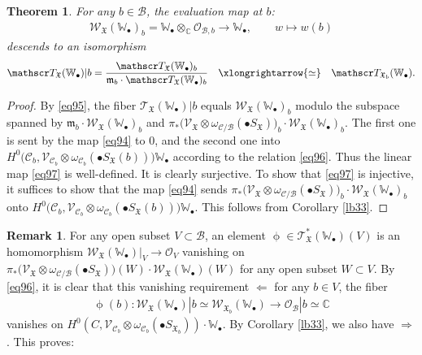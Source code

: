 \documentclass[12pt,a4paper,notitlepage]{report}
\theoremstyle{definition}
\newtheorem{rem}[df]{Remark}
\theoremstyle{plain}
\newtheorem{thm}[df]{Theorem}
\newcommand{\fk}{\mathfrak}
\newcommand{\mc}{\mathcal}
\newcommand{\scr}{\mathscr}
\newcommand{\blt}{\bullet}
\newcommand{\Wbb}{\mathbb W}
\newcommand{\Cbb}{\mathbb C}
\numberwithin{equation}{section}
\begin{document}
\begin{thm}\label{lb69}
For any $b\in\mc B$, the evaluation map at $b$:
\begin{gather}
\scr W_{\fk X}(\Wbb_\blt)_b=\Wbb_\blt\otimes_\Cbb\scr O_{\mc B,b}\rightarrow \Wbb_\blt,\qquad w\mapsto w(b)\label{eq94}
\end{gather}
descends to an isomorphism
\begin{gather}
\scr T_{\fk X}(\Wbb_\blt)|b=\frac{\scr T_{\fk X}(\Wbb_\blt)_b}{\fk m_b\cdot \scr T_{\fk X}(\Wbb_\blt)_b}\quad\xlongrightarrow{\simeq} \quad\scr T_{\fk X_b}(\Wbb_\blt).\label{eq97}
\end{gather}
\end{thm}

\begin{proof}
By \eqref{eq95}, the fiber $\scr T_{\fk X}(\Wbb_\blt)|b$ equals $\scr W_{\fk X}(\Wbb_\blt)_b$ modulo the subspace spanned by $\fk m_b\cdot\scr W_{\fk X}(\Wbb_\blt)_b$ and $\pi_*\big(\scr V_{\fk X}\otimes\omega_{\mc C/\mc B}(\blt S_{\fk X})\big)_b\cdot \scr W_{\fk X}(\Wbb_\blt)_b$. The first one is sent by the map \eqref{eq94} to $0$, and the second one into $H^0\big(\mc C_b,\scr V_{\mc C_b}\otimes\omega_{\mc C_b}(\blt S_{\fk X}(b))\big) \Wbb_\blt$ according to the relation \eqref{eq96}. Thus the linear map \eqref{eq97} is well-defined. It is clearly surjective. To show that \eqref{eq97} is injective, it suffices to show that the map  \eqref{eq94} sends $\pi_*\big(\scr V_{\fk X}\otimes\omega_{\mc C/\mc B}(\blt S_{\fk X})\big)_b\cdot \scr W_{\fk X}(\Wbb_\blt)_b$ onto $H^0\big(\mc C_b,\scr V_{\mc C_b}\otimes\omega_{\mc C_b}(\blt S_{\fk X}(b))\big) \Wbb_\blt$. This follows from Corollary \ref{lb33}.
\end{proof}

\begin{rem}
For any open subset $V\subset\mc B$, an element $\upphi\in\scr T_{\fk X}^*(\Wbb_\blt)(V)$ is an homomorphism $\scr W_{\fk X}(\Wbb_\blt)|_V\rightarrow\scr O_V$ vanishing on $\pi_*\big(\scr V_{\fk X}\otimes\omega_{\mc C/\mc B}(\blt S_{\fk X})\big)(W)\cdot \scr W_{\fk X}(\Wbb_\blt)(W)$ for any open subset $W\subset V$. By \eqref{eq96}, it is clear that this vanishing requirement $\Leftarrow$ for any $b\in V$, the fiber
\begin{align*}
\upphi(b):\scr W_{\fk X}(\Wbb_\blt)|b\simeq\scr W_{\fk X_b}(\Wbb_\blt)\rightarrow \scr O_{\mc B}|b\simeq \Cbb
\end{align*}
vanishes on $H^0(C,\scr V_{\mc C_b}\otimes\omega_{\mc C_b}(\blt S_{\fk X_b}))\cdot\Wbb_\blt$. By Corollary \ref{lb33}, we also have $\Rightarrow$. This proves:
\end{rem}
\end{document}
